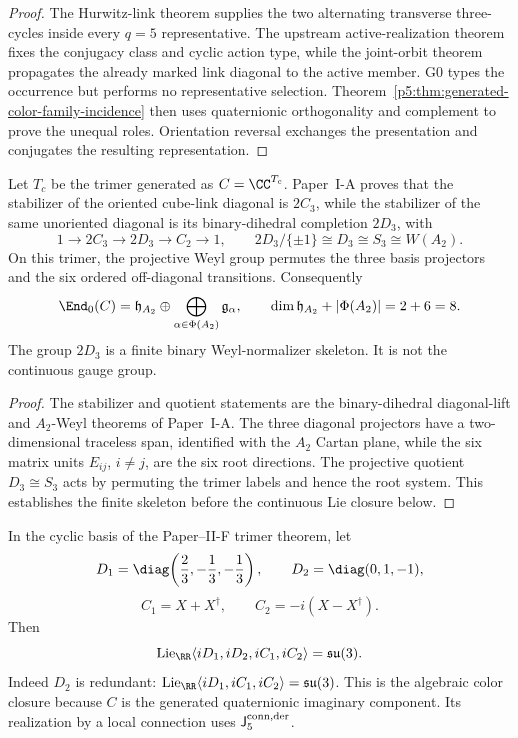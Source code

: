 \documentclass[12pt,a4paper]{article}
\begin{document}
\begin{proof}
The Hurwitz-link theorem supplies the two alternating transverse three-cycles
inside every \(q=5\) representative.  The upstream active-realization theorem
fixes the conjugacy class and cyclic action type, while the joint-orbit theorem
propagates the already marked link diagonal to the active member.  G0 types
the occurrence but performs no representative selection.
Theorem~\ref{p5:thm:generated-color-family-incidence} then
uses quaternionic orthogonality and complement to prove the unequal roles.
Orientation reversal exchanges the presentation and conjugates the resulting
representation.
\end{proof}

\begin{theorem}
\label{p5:thm:binary-dihedral-color-skeleton}
Let \(T_c\) be the trimer generated as \(C=\CC^{T_c}\).  Paper~I-A proves
that the stabilizer of the oriented cube-link diagonal is \(2C_3\), while the
stabilizer of the same unoriented diagonal is its binary-dihedral completion
\(2D_3\), with
\[
1\longrightarrow2C_3\longrightarrow2D_3\longrightarrow C_2\longrightarrow1,
\qquad
2D_3/\{\pm1\}\cong D_3\cong S_3\cong W(A_2).
\]
On this trimer, the projective Weyl group permutes the three basis projectors
and the six ordered off-diagonal transitions.  Consequently
\[
\End_0(C)
=
\mathfrak h_{A_2}
\oplus
\bigoplus_{\alpha\in\Phi(A_2)}\mathfrak g_\alpha,
\qquad
\dim\mathfrak h_{A_2}+|\Phi(A_2)|=2+6=8.
\]
The group \(2D_3\) is a finite binary Weyl-normalizer skeleton.  It is not the
continuous gauge group.
\end{theorem}

\begin{proof}
The stabilizer and quotient statements are the binary-dihedral diagonal-lift
and \(A_2\)-Weyl theorems of Paper~I-A.  The three diagonal projectors have a
two-dimensional traceless span, identified with the \(A_2\) Cartan plane,
while the six matrix units \(E_{ij}\), \(i\ne j\), are the six root
directions.  The projective quotient \(D_3\cong S_3\) acts by permuting the
trimer labels and hence the root system.  This establishes the finite skeleton
before the continuous Lie closure below.
\end{proof}

\begin{theorem}
\label{p5:thm:trimer-su3-lie-closure}
In the cyclic basis of the Paper--II-F trimer theorem, let
\[
D_1=\diag\!\left(\frac23,-\frac13,-\frac13\right),
\qquad
D_2=\diag(0,1,-1),
\]
\[
C_1=X+X^\dagger,\qquad C_2=-i(X-X^\dagger).
\]
Then
\[
\operatorname{Lie}_{\RR}
\langle iD_1,iD_2,iC_1,iC_2\rangle
=\mathfrak{su}(3).
\]
Indeed \(D_2\) is redundant:
\(\operatorname{Lie}_{\RR}\langle iD_1,iC_1,iC_2\rangle
=\mathfrak{su}(3)\).
This is the algebraic color closure because \(C\) is the generated
quaternionic imaginary component.  Its realization by a local connection
uses \(\mathsf J_5^{\rm conn,der}\).
\end{theorem}
\end{document}
